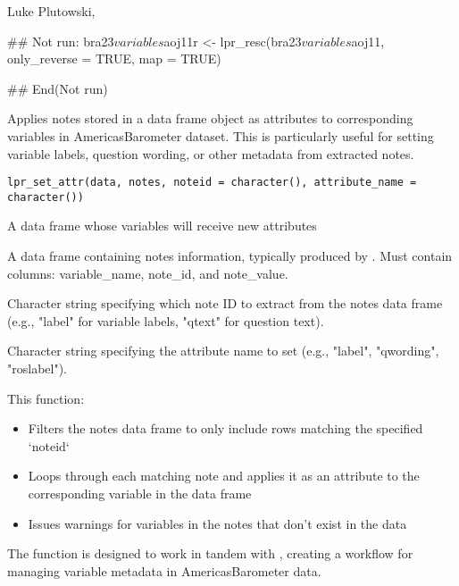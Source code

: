 \documentclass[a4paper]{book}
\begin{document}
%
\begin{Author}
Luke Plutowski, 
\end{Author}
%
\begin{Examples}
\begin{ExampleCode}
## Not run: 
bra23$variables$aoj11r <- lpr_resc(bra23$variables$aoj11, only_reverse = TRUE, map = TRUE)

## End(Not run)
\end{ExampleCode}
\end{Examples}
%
\begin{Description}
Applies notes stored in a data frame object as attributes to corresponding variables
in AmericasBarometer dataset. This is particularly useful for setting variable labels,
question wording, or other metadata from extracted notes.
\end{Description}
%
\begin{Usage}
\begin{verbatim}
lpr_set_attr(data, notes, noteid = character(), attribute_name = character())
\end{verbatim}
\end{Usage}
%
\begin{Arguments}
\begin{ldescription}
\item[\code{data}] A data frame whose variables will receive new attributes

\item[\code{notes}] A data frame containing notes information, typically produced by
. Must contain columns: variable\_name,
note\_id, and note\_value.

\item[\code{noteid}] Character string specifying which note ID to extract from the
notes data frame (e.g., "label" for variable labels, "qtext" for question text).

\item[\code{attribute\_name}] Character string specifying the attribute name to set
(e.g., "label", "qwording", "roslabel").
\end{ldescription}
\end{Arguments}
%
\begin{Details}
This function:
\begin{itemize}

\item{} Filters the notes data frame to only include rows matching the specified `noteid`
\item{} Loops through each matching note and applies it as an attribute to the corresponding
variable in the data frame
\item{} Issues warnings for variables in the notes that don't exist in the data

\end{itemize}


The function is designed to work in tandem with , creating
a workflow for managing variable metadata in AmericasBarometer data.
\end{Details}
\end{document}
